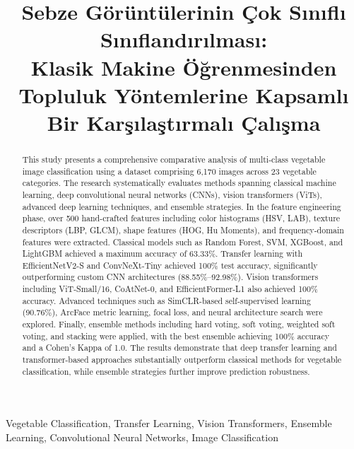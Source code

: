 \documentclass[conference]{IEEEtran}
\begin{document}
\title{Sebze G\"{o}r\"{u}nt\"{u}lerinin \c{C}ok S{\i}n{\i}fl{\i} S{\i}n{\i}fland{\i}r{\i}lmas{\i}:\\ Klasik Makine \"{O}\u{g}renmesinden Topluluk Y\"{o}ntemlerine Kapsaml{\i} Bir Kar\c{s}{\i}la\c{s}t{\i}rmal{\i} \c{C}al{\i}\c{s}ma}

\author{
\IEEEauthorblockA{}
}

\maketitle

\begin{abstract}
This study presents a comprehensive comparative analysis of multi-class vegetable image classification using a dataset comprising 6{,}170 images across 23 vegetable categories. The research systematically evaluates methods spanning classical machine learning, deep convolutional neural networks (CNNs), vision transformers (ViTs), advanced deep learning techniques, and ensemble strategies. In the feature engineering phase, over 500 hand-crafted features including color histograms (HSV, LAB), texture descriptors (LBP, GLCM), shape features (HOG, Hu Moments), and frequency-domain features were extracted. Classical models such as Random Forest, SVM, XGBoost, and LightGBM achieved a maximum accuracy of 63.33\%. Transfer learning with EfficientNetV2-S and ConvNeXt-Tiny achieved 100\% test accuracy, significantly outperforming custom CNN architectures (88.55\%--92.98\%). Vision transformers including ViT-Small/16, CoAtNet-0, and EfficientFormer-L1 also achieved 100\% accuracy. Advanced techniques such as SimCLR-based self-supervised learning (90.76\%), ArcFace metric learning, focal loss, and neural architecture search were explored. Finally, ensemble methods including hard voting, soft voting, weighted soft voting, and stacking were applied, with the best ensemble achieving 100\% accuracy and a Cohen's Kappa of 1.0. The results demonstrate that deep transfer learning and transformer-based approaches substantially outperform classical methods for vegetable classification, while ensemble strategies further improve prediction robustness.
\end{abstract}

\begin{IEEEkeywords}
Vegetable Classification, Transfer Learning, Vision Transformers, Ensemble Learning, Convolutional Neural Networks, Image Classification
\end{IEEEkeywords}
\end{document}

